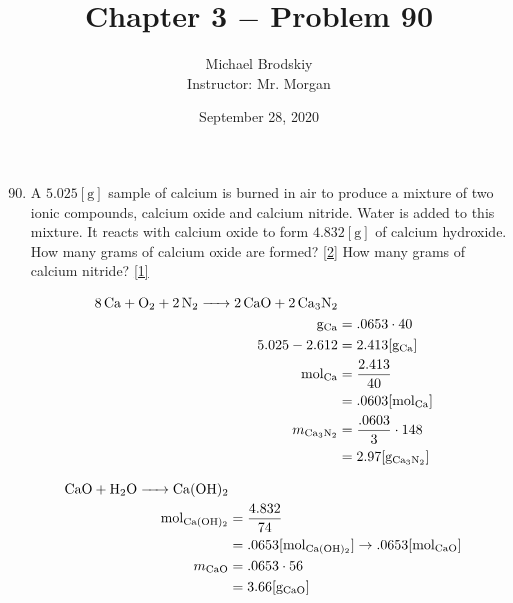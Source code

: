 \documentclass[12pt]{article}
\title{Chapter 3 $-$ Problem 90}
\date{September 28, 2020}
\author{Michael Brodskiy\\ \small Instructor: Mr. Morgan}
\begin{document}
\maketitle

\begin{enumerate}

    \setcounter{enumi}{89}

  \item A $5.025[\si{\gram}]$ sample of calcium is burned in air to produce a mixture of two ionic compounds, calcium oxide and calcium nitride. Water is added to this mixture. It reacts with calcium oxide to form $4.832[\si{\gram}]$ of calcium hydroxide. How many grams of calcium oxide are formed? \eqref{2} How many grams of calcium nitride? \eqref{1}

    \begin{equation}
      \begin{split}
        \ce{8Ca + O2 + 2N2 -> 2CaO + 2Ca3N2}\\
        \si{\gram}_{\ce{Ca}} & = .0653\cdot 40 \\
        5.025 - 2.612 & = 2.413[\si{\gram}_{\ce{Ca}}] \\
        \si{\mole}_{\ce{Ca}} & = \frac{2.413}{40} \\
        & = .0603[\si{\mole}_{\ce{Ca}}] \\
        m_{\ce{Ca3N2}} & = \frac{.0603}{3} \cdot 148 \\
        & = 2.97[\si{\gram}_{\ce{Ca3N2}}] \\
      \end{split}
      \label{1}
    \end{equation}

    \begin{equation}
      \begin{split}
        \ce{CaO + H2O -> Ca(OH)2} \\
        \si{\mole}_{\ce{Ca(OH)2}} & = \frac{4.832}{74} \\
        & = .0653[\si{\mole}_{\ce{Ca(OH)2}}] \rightarrow .0653[\si{\mole}_{\ce{CaO}}] \\
        m_{\ce{CaO}} & = .0653\cdot56 \\
        & = 3.66[\si{\gram}_{\ce{CaO}}] \\
      \end{split}
      \label{2}
    \end{equation}

\end{enumerate}
\end{document}
